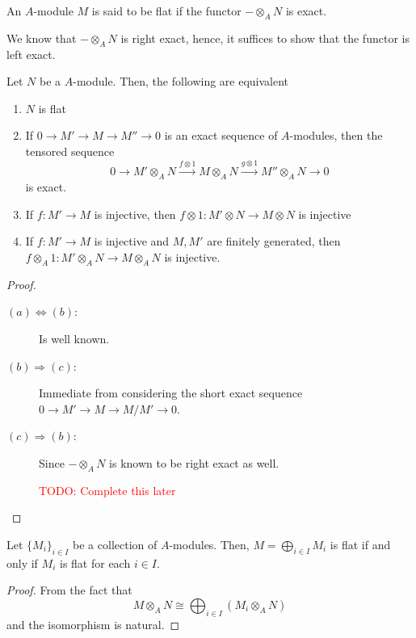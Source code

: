 \begin{definition}
    An $A$-module $M$ is said to be flat if the functor $-\otimes_A N$ is exact.
\end{definition}

We know that $-\otimes_AN$ is right exact, hence, it suffices to show that the functor is left exact.

\begin{theorem}
    Let $N$ be a $A$-module. Then, the following are equivalent 
    \begin{enumerate}[label=(\alph*)]
        \item $N$ is flat 
        \item If $0\rightarrow M'\rightarrow M\rightarrow M''\rightarrow 0$ is an exact sequence of $A$-modules, then the tensored sequence 
        \begin{equation*}
        0\longrightarrow M'\otimes_A N\stackrel{f\otimes 1}{\longrightarrow} M\otimes_A N\stackrel{g\otimes 1}{\longrightarrow} M''\otimes_A N\longrightarrow 0
        \end{equation*}
        is exact.
        \item If $f: M'\to M$ is injective, then $f\otimes 1: M'\otimes N\to M\otimes N$ is injective 
        \item If $f: M'\to M$ is injective and $M,M'$ are finitely generated, then $f\otimes_A 1: M'\otimes_A N\to M\otimes_A N$ is injective.
    \end{enumerate}
\end{theorem}
\begin{proof}
\hfill 
\begin{description}
\item[$(a)\Longleftrightarrow(b)$:] Is well known.
\item[$(b)\Longrightarrow(c)$:] Immediate from considering the short exact sequence $0\rightarrow M'\rightarrow M\rightarrow M/M'\rightarrow0$.
\item[$(c)\Longrightarrow(b)$:] Since $-\otimes_A N$ is known to be right exact as well. 
\item[] \textcolor{red}{TODO: Complete this later}
\end{description}
\end{proof}

\begin{proposition}
    Let $\{M_i\}_{i\in I}$ be a collection of $A$-modules. Then, $M = \bigoplus\limits_{i\in I}M_i$ is flat if and only if $M_i$ is flat for each $i\in I$.
\end{proposition}
\begin{proof}
    From the fact that 
    \begin{equation*}
        M\otimes_A N\cong\bigoplus_{i\in I}(M_i\otimes_A N)
    \end{equation*}
    and the isomorphism is natural.
\end{proof}

